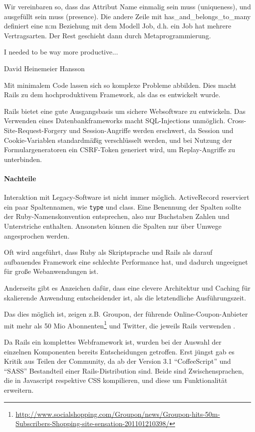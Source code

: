 Wir vereinbaren so, dass das Attribut Name einmalig sein muss (uniqueness), und ausgefüllt sein muss (presence). Die andere Zeile mit has\_and\_belongs\_to\_many definiert eine n:m Beziehung mit dem Modell Job, d.h. ein Job hat mehrere Vertragsarten. Der Rest geschieht dann durch Metaprogrammierung.

\epigraph{I needed to be way more productive...}{David Heinemeier Hansson}
Mit minimalem Code lassen sich so komplexe Probleme abbilden. Dies macht Rails zu dem hochproduktivem Framework, als das es entwickelt wurde.


Rails bietet eine gute Ausgangsbasis um sichere Websoftware zu entwickeln. Das Verwenden eines Datenbankframeworks macht SQL-Injections unmöglich. 
Cross-Site-Request-Forgery und Session-Angriffe werden erschwert, da Session und Cookie-Variablen standardmäßig verschlüsselt werden, und bei Nutzung der Formulargeneratoren ein CSRF-Token generiert wird, um Replay-Angriffe zu unterbinden.

\paragraph{Nachteile}
Interaktion mit Legacy-Software ist nicht immer möglich. ActiveRecord reserviert ein paar Spaltennamen, wie \texttt{type} und  class. Eine Benennung der Spalten sollte der Ruby-Namenskonvention entsprechen, also nur Buchstaben Zahlen und Unterstriche enthalten. Ansonsten können die Spalten nur über Umwege angesprochen werden.

 Oft wird angeführt, dass Ruby als Skriptsprache und Rails als darauf aufbauendes Framework eine schlechte Performance hat, und dadurch ungeeignet für große Webanwendungen ist.


Anderseits gibt es Anzeichen dafür, dass eine clevere Architektur und Caching für skalierende Anwendung entscheidender ist, als die letztendliche Ausführungszeit.

Das dies möglich ist, zeigen z.B. Groupon, der führende Online-Coupon-Anbieter mit mehr als 50 Mio Abonnenten\footnote{\url{http://www.socialshopping.com/Groupon/news/Groupon-hits-50m-Subscribers-Shopping-site-sensation-201101210398/}} und Twitter, die jeweils Rails verwenden \citep{ruby_on_rails_2011}.

 Da Rails ein komplettes Webframework ist, wurden bei der Auswahl der einzelnen Komponenten bereits Entscheidungen getroffen. Erst jüngst gab es Kritik aus Teilen der Community, da ab der Version 3.1 "`CoffeeScript"' und "`SASS"' Bestandteil einer Rails-Distribution sind. Beide sind Zwischensprachen, die in Javascript respektive CSS kompilieren, und diese um Funktionalität erweitern. 

